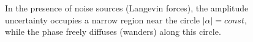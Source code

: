 \begin{figure}
\centering



\caption{In the presence of noise sources (Langevin forces), the amplitude uncertainty occupies a narrow region near the circle $\left|\alpha\right| = const$, while the phase freely diffuses (wanders) along this circle.}
\label{figPart2Laser2_3}
\end{figure}